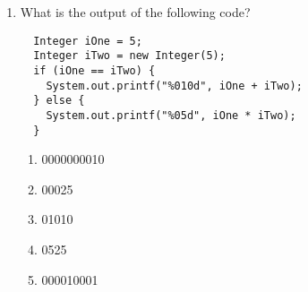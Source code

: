 \documentclass[S17-Final.tex]{subfiles}
\begin{document}
\begin{enumerate}
\item What is the output of the following code?
\begin{lstlisting}
  Integer iOne = 5;
  Integer iTwo = new Integer(5);
  if (iOne == iTwo) {
    System.out.printf("%010d", iOne + iTwo);
  } else {
    System.out.printf("%05d", iOne * iTwo);
  }
\end{lstlisting}
\clearpage
\begin{enumerate}
\item  0000000010
\item  00025
\item  01010
\item  0525
\item  000010001
\end{enumerate}


\end{enumerate}
\end{document}
